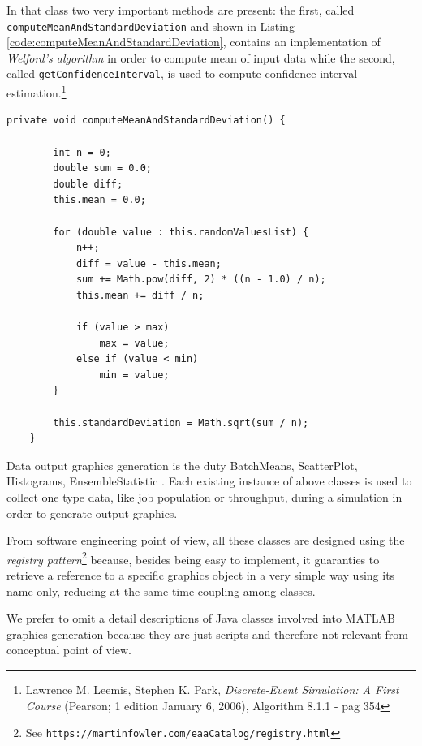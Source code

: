 \documentclass[10pt,a4paper]{article}
\begin{document}
In that class two very important methods are present: the first, called \texttt{computeMeanAnd\-Stan\-dard\-Deviation} and shown in Listing \ref{code:computeMeanAndStandardDeviation}, contains an implementation of \textit{Welford’s algorithm} in order to compute mean of input data while the second, called \texttt{getConfidenceInterval}, is used to compute confidence interval estimation.\footnote{Lawrence M. Leemis, Stephen K. Park, \textit{Discrete-Event Simulation: A First Course} (Pearson; 1 edition January 6, 2006), Algorithm 8.1.1 - pag 354}

\begin{lstlisting}[frame=lines, caption={\texttt{computeMeanAndStandardDeviation} method implementation},label={code:computeMeanAndStandardDeviation}]
private void computeMeanAndStandardDeviation() {

        int n = 0;
        double sum = 0.0;
        double diff;
        this.mean = 0.0;

        for (double value : this.randomValuesList) {
            n++;
            diff = value - this.mean;
            sum += Math.pow(diff, 2) * ((n - 1.0) / n);
            this.mean += diff / n;

            if (value > max)
                max = value;
            else if (value < min)
                min = value;
        }

        this.standardDeviation = Math.sqrt(sum / n);
    }
\end{lstlisting}

Data output graphics generation is the duty 
BatchMeans, ScatterPlot, Histograms, EnsembleStatistic . Each existing instance of above classes is used to collect one type data, like job population or throughput, during a simulation in order to generate output graphics.

 

From software engineering point of view, all these classes are designed using the \textit{registry pattern}\footnote{See \texttt{https://martinfowler.com/eaaCatalog/registry.html}} because, besides being easy to implement, it guaranties to retrieve a reference to a specific   graphics object in a very simple way using its name only, reducing at the same time coupling among classes. 

We prefer to omit a detail descriptions of Java classes involved into MATLAB graphics generation because they are just scripts and therefore not relevant from conceptual point of view. 
\end{document}
